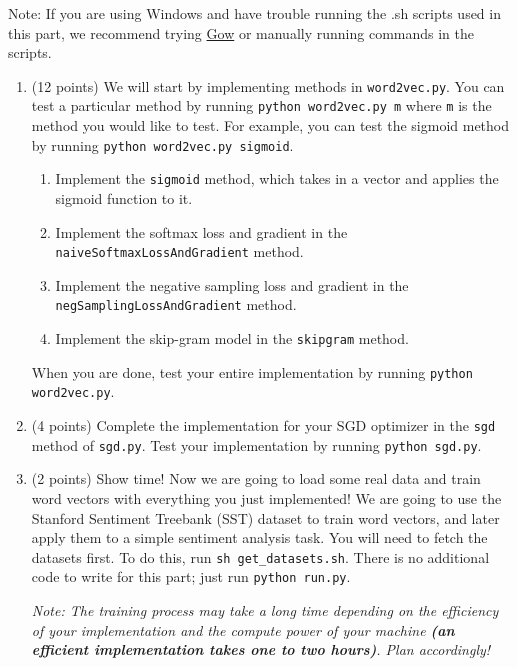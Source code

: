 \documentclass{article}
\begin{document}
Note: If you are using Windows and have trouble running the .sh scripts used in this part, we recommend trying \href{https://github.com/bmatzelle/gow}{Gow} or manually running commands in the scripts.

\begin{enumerate}[label=(\alph*)]
    \item (12 points) We will start by implementing methods in \texttt{word2vec.py}. You can test a particular method by running \texttt{python word2vec.py m} where \texttt{m} is the method you would like to test. For example, you can test the sigmoid method by running \texttt{python word2vec.py sigmoid}.
    
    \begin{enumerate}[label=(\roman*)]
        \item Implement the \texttt{sigmoid} method, which takes in a vector and applies the sigmoid function to it.
        \item Implement the softmax loss and gradient in the \texttt{naiveSoftmaxLossAndGradient} method.
        \item Implement the negative sampling loss and gradient in the \texttt{negSamplingLossAndGradient} method.
        \item Implement the skip-gram model in the \texttt{skipgram} method. 
    \end{enumerate}
    
    When you are done, test your entire implementation by running \texttt{python word2vec.py}.
    
    \item (4 points) Complete the implementation for your SGD optimizer in the \texttt{sgd} method of \texttt{sgd.py}. Test your implementation by running \texttt{python sgd.py}.
    
    \item (2 points) Show time! Now we are going to load some real data and train word vectors with everything you just implemented! We are going to use the Stanford Sentiment Treebank (SST) dataset to train word vectors, and later apply them to a simple sentiment analysis task. You will need to fetch the datasets first. To do this, run \texttt{sh get\_datasets.sh}. There is no additional code to write for this part; just run \texttt{python run.py}.
    
    \emph{Note: The training process may take a long time depending on the efficiency of your implementation and the compute power of your machine \textbf{(an efficient implementation takes one to two hours)}. Plan accordingly!}
    

\end{enumerate}
\end{document}
